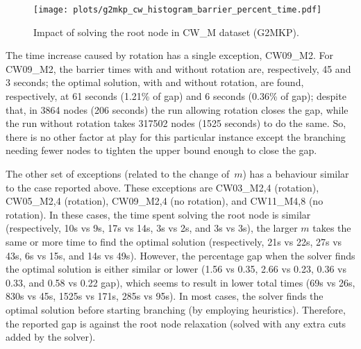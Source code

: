 \begin{figure}[!htbp]
  \caption{Impact of solving the root node in CW\_M dataset (G2MKP).}
  \center
  \texttt{[image: plots/g2mkp\_cw\_histogram\_barrier\_percent\_time.pdf]}
  \legend{The histogram has 10 bins, each bin aggregates the runs spending \((x, x + 10]\)\% of their time solving the root node (\(x \in [0, 10, 20, 30, 40, 50, 60, 70, 80, 90]\)). Souce: the author.}
  \label{fig:g2mkp_cw_histogram_barrier_percent_time}
\end{figure}

The time increase caused by rotation has a single exception, CW09\_M2.
For CW09\_M2, the barrier times with and without rotation are, respectively, 45 and 3 seconds; the optimal solution, with and without rotation, are found, respectively, at 61 seconds (1.21\% of gap) and 6 seconds (0.36\% of gap); despite that, in 3864 nodes (206 seconds) the run allowing rotation closes the gap, while the run without rotation takes 317502 nodes (1525 seconds) to do the same.
So, there is no other factor at play for this particular instance except the branching needing fewer nodes to tighten the upper bound enough to close the gap.



The other set of exceptions (related to the change of~\(m\)) has a behaviour similar to the case reported above.
These exceptions are CW03\_M{2,4} (rotation), CW05\_M{2,4} (rotation), CW09\_M{2,4} (no rotation), and CW11\_M{4,8} (no rotation).
In these cases, the time spent solving the root node is similar (respectively, 10s vs 9s, 17s vs 14s, 3s vs 2s, and 3s vs 3s), the larger \(m\) takes the same or more time to find the optimal solution (respectively, 21s vs 22s, 27s vs 43s, 6s vs 15s, and 14s vs 49s).
However, the percentage gap when the solver finds the optimal solution is either similar or lower (1.56 vs 0.35, 2.66 vs 0.23, 0.36 vs 0.33, and 0.58 vs 0.22 gap), which seems to result in lower total times (69s vs 26s, 830s vs 45s, 1525s vs 171s, 285s vs 95s).
In most cases, the solver finds the optimal solution before starting branching (by employing heuristics).
Therefore, the reported gap is against the root node relaxation (solved with any extra cuts added by the solver).

